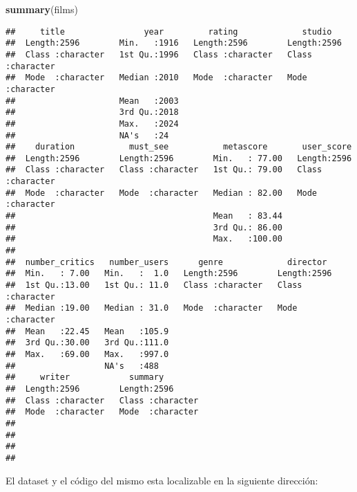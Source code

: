 \documentclass[
]{article}
\newenvironment{Shaded}{\begin{snugshade}}{\end{snugshade}}
\newcommand{\FunctionTok}[1]{\textcolor[rgb]{0.13,0.29,0.53}{\textbf{#1}}}
\newcommand{\NormalTok}[1]{#1}
\begin{document}
\begin{Shaded}
\begin{Highlighting}[]
\FunctionTok{summary}\NormalTok{(films)}
\end{Highlighting}
\end{Shaded}

\begin{verbatim}
##     title                year         rating             studio         
##  Length:2596        Min.   :1916   Length:2596        Length:2596       
##  Class :character   1st Qu.:1996   Class :character   Class :character  
##  Mode  :character   Median :2010   Mode  :character   Mode  :character  
##                     Mean   :2003                                        
##                     3rd Qu.:2018                                        
##                     Max.   :2024                                        
##                     NA's   :24                                          
##    duration           must_see           metascore       user_score       
##  Length:2596        Length:2596        Min.   : 77.00   Length:2596       
##  Class :character   Class :character   1st Qu.: 79.00   Class :character  
##  Mode  :character   Mode  :character   Median : 82.00   Mode  :character  
##                                        Mean   : 83.44                     
##                                        3rd Qu.: 86.00                     
##                                        Max.   :100.00                     
##                                                                           
##  number_critics   number_users      genre             director        
##  Min.   : 7.00   Min.   :  1.0   Length:2596        Length:2596       
##  1st Qu.:13.00   1st Qu.: 11.0   Class :character   Class :character  
##  Median :19.00   Median : 31.0   Mode  :character   Mode  :character  
##  Mean   :22.45   Mean   :105.9                                        
##  3rd Qu.:30.00   3rd Qu.:111.0                                        
##  Max.   :69.00   Max.   :997.0                                        
##                  NA's   :488                                          
##     writer            summary         
##  Length:2596        Length:2596       
##  Class :character   Class :character  
##  Mode  :character   Mode  :character  
##                                       
##                                       
##                                       
## 
\end{verbatim}

El dataset y el código del mismo esta localizable en la siguiente
dirección:
\end{document}
